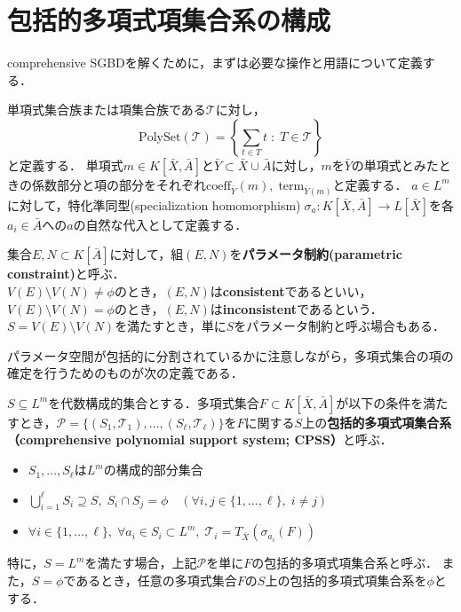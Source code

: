 \section{包括的多項式項集合系の構成}
comprehensive SGBDを解くために，まずは必要な操作と用語について定義する．
\par
単項式集合族または項集合族である$\mathscr{T}$に対し，$$\displaystyle \mathrm{PolySet}(\mathscr{T}) = \left\{ \sum_{t \in T} t \; : \; T \in \mathscr{T} \right\}$$
と定義する．
単項式$m \in K[\bar{X}, \bar{A}]$と$\bar{Y} \subset \bar{X} \cup \bar{A}$に対し，$m$を$\bar{Y}$の単項式とみたときの係数部分と項の部分をそれぞれ$\mathrm{coeff}_{\bar{Y}}(m), \; \mathrm{term}_{\bar{Y}(m)}$と定義する．
$a \in L^m$に対して，特化準同型(specialization homomorphism)$\; \sigma_a : K[\bar{X}, \bar{A}] \to L[\bar{X}]$を各$a_i \in \bar{A}$への$a$の自然な代入として定義する．
\begin{definition}
	\label{chapter04:definition:parameter_constraint}
	集合$E, N \subset K[\bar{A}]$に対して，組$(E, N)$を\textbf{パラメータ制約(parametric constraint)}と呼ぶ．\\
	$V(E) \setminus V(N) \ne \phi$のとき，$(E, N)$は\textbf{consistent}であるといい，$V(E) \setminus V(N) = \phi$のとき，$(E, N)$は\textbf{inconsistent}であるという．
	$S = V(E) \setminus V(N)$を満たすとき，単に$S$をパラメータ制約と呼ぶ場合もある．
\end{definition}
パラメータ空間が包括的に分割されているかに注意しながら，多項式集合の項の確定を行うためのものが次の定義である．
\begin{definition}
	\label{chapter04:definition:CPSS}
	$S \subseteq L^m$を代数構成的集合とする．多項式集合$F \subset K[\bar{X}, \bar{A}]$が以下の条件を満たすとき，$\mathcal{P} = \{ (S_1, \mathscr{T}_1), \dots , (S_\ell, \mathscr{T}_\ell)  \}$を$F$に関する$S$上の\textbf{包括的多項式項集合系（comprehensive polynomial support system; CPSS）}と呼ぶ．
	\begin{itemize}
		\item $S_1, \dots, S_\ell$は$L^m$の構成的部分集合
		\item $\displaystyle \bigcup_{i=1}^\ell S_i\supseteq S, \; S_i \cap S_j = \phi \quad (\forall i,j \in \{ 1, \dots, \ell \}, \; i \ne j)$
		\item $\forall i \in \{1, \dots, \ell \}, \; \forall a_i \in S_i \subset L^m, \; \mathscr{T}_i = T_{\bar{X}}(\sigma_{a_i}(F))$
	\end{itemize}
	特に，$S=L^m$を満たす場合，上記$\mathcal{P}$を単に$F$の包括的多項式項集合系と呼ぶ．
	また，$S=\phi$であるとき，任意の多項式集合$F$の$S$上の包括的多項式項集合系を$\phi$とする．
\end{definition}

